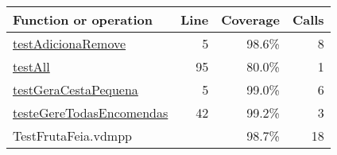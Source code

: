 \bigskip
\begin{longtable}{|l|r|r|r|}
\hline
Function or operation & Line & Coverage & Calls \\
\hline
\hline
\hyperref[testAdicionaRemove:5]{testAdicionaRemove} & 5&98.6\% & 8 \\
\hline
\hyperref[testAll:95]{testAll} & 95&80.0\% & 1 \\
\hline
\hyperref[testGeraCestaPequena:5]{testGeraCestaPequena} & 5&99.0\% & 6 \\
\hline
\hyperref[testeGereTodasEncomendas:42]{testeGereTodasEncomendas} & 42&99.2\% & 3 \\
\hline
\hline
TestFrutaFeia.vdmpp & & 98.7\% & 18 \\
\hline
\end{longtable}


